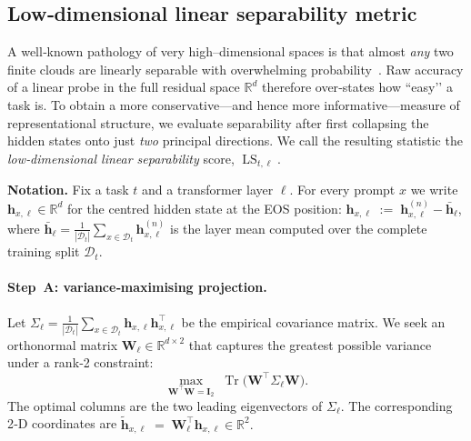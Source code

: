 \documentclass{article}
\begin{document}
\subsection{Low‑dimensional linear separability metric}
\label{subsec:lsmetric}

A well‑known pathology of very high–dimensional spaces is that almost
\emph{any} two finite clouds are linearly separable with overwhelming
probability \citep[see][]{cover1965geometrical}.  
Raw accuracy of a linear probe in the full residual space
$\mathbb R^{d}$ therefore over‑states how “easy’’ a task is.  
To obtain a more conservative—and hence more informative—measure of
representational structure, we evaluate separability after first
collapsing the hidden states onto just \emph{two} principal directions.
We call the resulting statistic the
\emph{low‑dimensional linear separability} score,
$\operatorname{LS}_{t,\ell}$.

\vspace{0.5\baselineskip}
\noindent
\textbf{Notation.}\;
Fix a task $t$ and a transformer layer $\ell$.
For every prompt $x$ we write
$
  \mathbf h_{x,\ell}\!\in\!\mathbb R^{d}
$
for the centred hidden state at the EOS position:
$\mathbf h_{x,\ell}\;:=\;\mathbf h_{x,\ell}^{(n)}-\bar{\mathbf h}_{\ell}$,
where
$
  \bar{\mathbf h}_{\ell}
  =\tfrac1{|\mathcal D_t|}\sum_{x\in\mathcal D_t}\mathbf h_{x,\ell}^{(n)}
$
is the layer mean computed over the complete training split
$\mathcal D_t$.

\paragraph{Step A: variance‑maximising projection.}
Let
$
  \Sigma_\ell
  =\tfrac1{|\mathcal D_t|}
   \sum_{x\in\mathcal D_t}\mathbf h_{x,\ell}\mathbf h_{x,\ell}^{\!\top}
$
be the empirical covariance matrix.
We seek an orthonormal matrix
$\mathbf W_\ell\!\in\!\mathbb R^{d\times 2}$ that captures the greatest
possible variance under a rank‑2 constraint:
\begin{equation}
\label{eq:pca}
\max_{\mathbf W^\top \!\mathbf W=\mathbf I_2}\;
\operatorname{Tr}\!\bigl(\mathbf W^\top\Sigma_\ell\mathbf W\bigr).
\end{equation}
The optimal columns are the two leading eigenvectors of $\Sigma_\ell$.
The corresponding 2‑D coordinates are
$
  \tilde{\mathbf h}_{x,\ell}
  \;=\;
  \mathbf W_\ell^\top\mathbf h_{x,\ell}
  \in\mathbb R^{2}.
$
\end{document}
